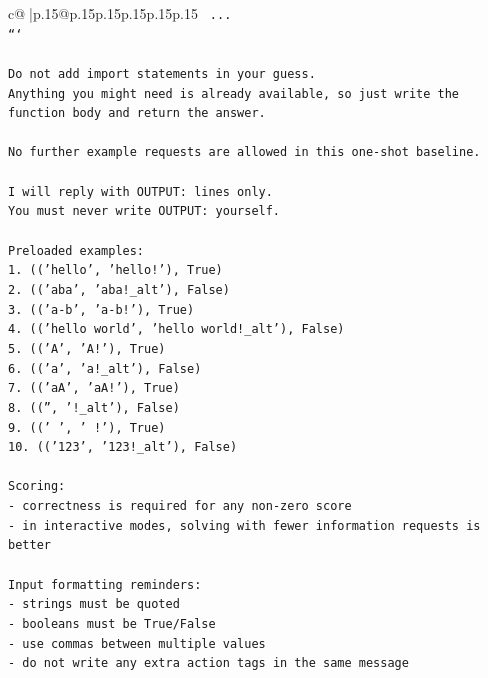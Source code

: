 \documentclass{article}
\begin{document}
{\begin{supertabular}{c@{$\;$}|p{.15\linewidth}@{}p{.15\linewidth}p{.15\linewidth}p{.15\linewidth}p{.15\linewidth}p{.15\linewidth}}
{{{\texttt{    ...} \\
\texttt{```} \\
\\ 
\texttt{Do not add import statements in your guess.} \\
\texttt{Anything you might need is already available, so just write the function body and return the answer.} \\
\\ 
\texttt{No further example requests are allowed in this one{-}shot baseline.} \\
\\ 
\texttt{I will reply with OUTPUT: lines only.} \\
\texttt{You must never write OUTPUT: yourself.} \\
\\ 
\texttt{Preloaded examples:} \\
\texttt{1. (('hello', 'hello!'), True)} \\
\texttt{2. (('aba', 'aba!\_alt'), False)} \\
\texttt{3. (('a{-}b', 'a{-}b!'), True)} \\
\texttt{4. (('hello world', 'hello world!\_alt'), False)} \\
\texttt{5. (('A', 'A!'), True)} \\
\texttt{6. (('a', 'a!\_alt'), False)} \\
\texttt{7. (('aA', 'aA!'), True)} \\
\texttt{8. (('', '!\_alt'), False)} \\
\texttt{9. (('   ', '   !'), True)} \\
\texttt{10. (('123', '123!\_alt'), False)} \\
\\ 
\texttt{Scoring:} \\
\texttt{{-} correctness is required for any non{-}zero score} \\
\texttt{{-} in interactive modes, solving with fewer information requests is better} \\
\\ 
\texttt{Input formatting reminders:} \\
\texttt{{-} strings must be quoted} \\
\texttt{{-} booleans must be True/False} \\
\texttt{{-} use commas between multiple values} \\
\texttt{{-} do not write any extra action tags in the same message} \\
\\ 
}}}
\end{supertabular}}
\end{document}
